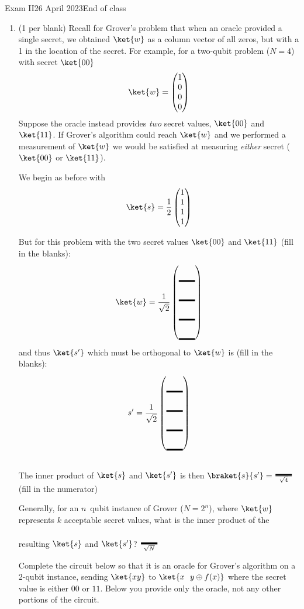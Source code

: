 \documentclass[12pt]{article}
\newcommand{\Blank}[1][1in]{\mbox{\vrule width #1 depth 2pt}\vrule width 0pt height 2.0em}
\begin{document}
\begin{assignment}{Exam II}{26 April 2023}{End of class}
\begin{enumerate}
\clearpage\item{} (1 per blank)
Recall for Grover's problem that when an oracle provided a single secret, we obtained $\ket{w}$ as a column vector of all zeros, but with a 1 in the location of the secret.   For example, for a two-qubit problem ($N=4$) with secret $\ket{00}$ 
\[ \ket{w} = \begin{pmatrix} 1 \\ 0 \\ 0 \\ 0\end{pmatrix} \]
Suppose the oracle instead provides \emph{two} secret values, $\ket{00}$ and $\ket{11}$.  If Grover's algorithm could reach $\ket{w}$ and we performed a measurement of $\ket{w}$ we would be satisfied at measuring \emph{either} secret ($\ket{00}$ or $\ket{11}$).

We begin as before with
\[ \ket{s} = \frac{1}{2}\begin{pmatrix} 1 \\ 1 \\ 1 \\ 1\end{pmatrix} \]

But for this problem with the two secret values $\ket{00}$ and $\ket{11}$ (fill in the blanks):
\[ \ket{w} = \frac{1}{\sqrt{2}}\begin{pmatrix} \Blank[2em]{} \\ \Blank[2em]{} \\\Blank[2em]{} \\\Blank[2em]{} \end{pmatrix} \]
and thus $\ket{s'}$ which must be orthogonal to $\ket{w}$ is (fill in the blanks):
\[ s' = \frac{1}{\sqrt{2}}\begin{pmatrix} \Blank[2em]{} \\ \Blank[2em]{} \\\Blank[2em]{} \\\Blank[2em]{} \end{pmatrix} \]
The inner product of $\ket{s}$ and $\ket{s'}$ is then
\( \braket{s}{s'} = \frac{\Blank[2em]{}}{\sqrt{4}} \) (fill in the numerator)

Generally, for an $n$~qubit instance of Grover ($N=2^n$), where $\ket{w}$ represents $k$ acceptable secret values, what is the inner product of the resulting $\ket{s}$ and $\ket{s'}$? $\frac{\Blank[2em]{}}{\sqrt{N}}$

Complete the circuit below so that it is an oracle for Grover's algorithm on a 2-qubit instance, sending $\ket{xy}$ to $\ket{x\ \  y\oplus f(x)}$ where the secret value is either $00$ or $11$.  Below you provide only the oracle, not any other portions of the circuit.


\end{enumerate}
\end{assignment}
\end{document}
